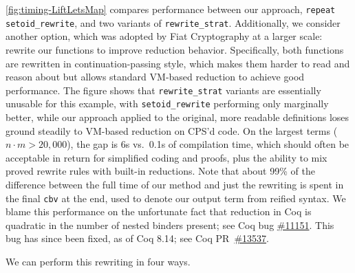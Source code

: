 \documentclass[a4paper,USenglish,cleveref,autoref,thm-restate]{lipics-v2021}
\newcommand{\coqbug}[1]{\href{https://github.com/coq/coq/issues/#1}{\##1}}
\newcommand{\coqpr}[1]{\href{https://github.com/coq/coq/pull/#1}{\##1}}
\newcommand{\taccbv}{\texttt{cbv}}
\begin{document}
\begin{minipage}[t][1cm]{\textwidth}
\autoref{fig:timing-LiftLetsMap} compares performance between our approach, \texttt{repeat setoid\_rewrite}, and two variants of \texttt{rewrite\_strat}.
Additionally, we consider another option, which was adopted by Fiat Cryptography at a larger scale: rewrite our functions to improve reduction behavior.
Specifically, both functions are rewritten in continuation-passing style, which makes them harder to read and reason about but allows standard VM-based reduction to achieve good performance.
The figure shows that \texttt{rewrite\_strat} variants are essentially unusable for this example, with \texttt{setoid\_rewrite} performing only marginally better, while our approach applied to the original, more readable definitions loses ground steadily to VM-based reduction on CPS'd code.
On the largest terms ($n \cdot m > 20,000$), the gap is 6s vs.\ 0.1s of compilation time, which should often be acceptable in return for simplified coding and proofs, plus the ability to mix proved rewrite rules with built-in reductions.
Note that about 99\% of the difference between the full time of our method and just the rewriting is spent in the final \taccbv{} at the end, used to denote our output term from reified syntax.
We blame this performance on the unfortunate fact that reduction in Coq is quadratic in the number of nested binders present; see Coq bug \coqbug{11151}.
This bug has since been fixed, as of Coq 8.14; see Coq PR~\coqpr{13537}.

We can perform this rewriting in four ways.


\end{minipage}
\end{document}
